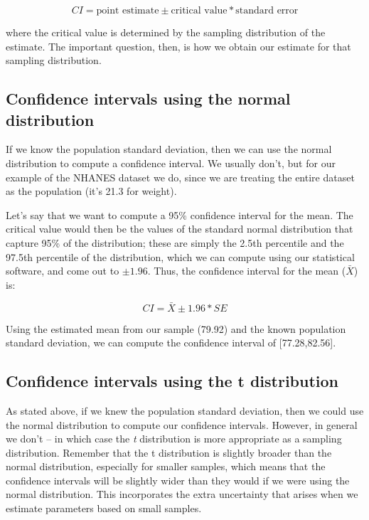 \documentclass[12pt,]{book}
\theoremstyle{definition}
\theoremstyle{definition}
\theoremstyle{definition}
\theoremstyle{remark}
\begin{document}
\[
CI = \text{point estimate} \pm \text{critical value} * \text{standard error}
\]

where the critical value is determined by the sampling distribution of the estimate. The important question, then, is how we obtain our estimate for that sampling distribution.

\hypertarget{confidence-intervals-using-the-normal-distribution}{%
\subsection{Confidence intervals using the normal distribution}\label{confidence-intervals-using-the-normal-distribution}}

If we know the population standard deviation, then we can use the normal distribution to compute a confidence interval. We usually don't, but for our example of the NHANES dataset we do, since we are treating the entire dataset as the population (it's 21.3 for weight).

Let's say that we want to compute a 95\% confidence interval for the mean. The critical value would then be the values of the standard normal distribution that capture 95\% of the distribution; these are simply the 2.5th percentile and the 97.5th percentile of the distribution, which we can compute using our statistical software, and come out to \(\pm 1.96\). Thus, the confidence interval for the mean (\(\bar{X}\)) is:

\[
CI = \bar{X} \pm 1.96*SE
\]

Using the estimated mean from our sample (79.92) and the known population standard deviation, we can compute the confidence interval of {[}77.28,82.56{]}.

\hypertarget{confidence-intervals-using-the-t-distribution}{%
\subsection{Confidence intervals using the t distribution}\label{confidence-intervals-using-the-t-distribution}}

As stated above, if we knew the population standard deviation, then we could use the normal distribution to compute our confidence intervals. However, in general we don't -- in which case the \emph{t} distribution is more appropriate as a sampling distribution. Remember that the t distribution is slightly broader than the normal distribution, especially for smaller samples, which means that the confidence intervals will be slightly wider than they would if we were using the normal distribution. This incorporates the extra uncertainty that arises when we estimate parameters based on small samples.
\end{document}
